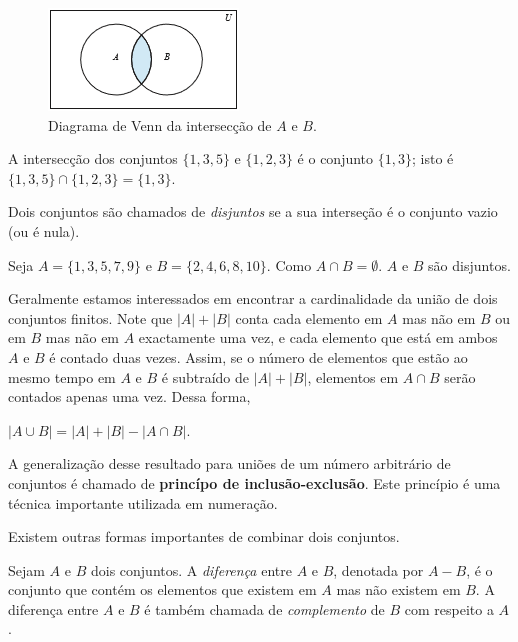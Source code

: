 \begin{figure}[H]
	\centering
	\includegraphics[scale=2.5]{chapter/imagens/32}
	\caption{Diagrama de Venn da intersecção de $A$ e $B$.}
	\label{fig32}
\end{figure}

\begin{exmp}
\label{exem316}
A intersecção dos conjuntos $\{1,3,5\}$ e $\{1,2,3\}$ é o conjunto $\{1,3\}$;
isto é $\{1,3,5\} \cap \{1,2,3\} = \{1,3\}$.
\end{exmp}

\begin{defn}
\label{def312}
Dois conjuntos são chamados de \emph{disjuntos} se a sua interseção é o conjunto
vazio (ou é nula).
\end{defn}

\begin{exmp}
\label{exem317}
Seja $A = \{1,3,5,7,9\}$ e $B = \{2,4,6,8,10\}$. Como $A \cap B = \emptyset$.
$A$ e $B$ são disjuntos.
\end{exmp}

Geralmente estamos interessados em encontrar a cardinalidade da união de dois
conjuntos finitos. Note que $|A| + |B|$ conta cada elemento em $A$ mas não em
$B$ ou em $B$ mas não em $A$ exactamente uma vez, e cada elemento que está em
ambos $A$ e $B$ é contado duas vezes. Assim, se o número de elementos que estão
ao mesmo tempo em $A$ e $B$ é subtraído de $|A|+|B|$, elementos em $A \cap B$
serão contados apenas uma vez. Dessa forma,
\begin{center}
$|A \cup B| = |A|+|B| - |A \cap B|$.
\end{center}

A generalização desse resultado para uniões de um número arbitrário de conjuntos
é chamado de \textbf{princípo de inclusão-exclusão}. Este princípio é
uma técnica importante utilizada em numeração.

Existem outras formas importantes de combinar dois conjuntos.

\begin{defn}
\label{def313}
Sejam $A$ e $B$ dois conjuntos. A \emph{diferença} entre $A$ e $B$, denotada por
$A - B$, é o conjunto que contém os elementos que existem em $A$ mas não existem
em $B$. A diferença entre $A$ e $B$ é também chamada de \emph{complemento} de
$B$ com respeito a $A$.
\end{defn}

